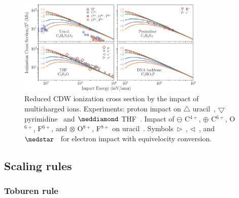 \documentclass[10pt,showpacs,twocolumn]{revtex4}
\begin{document}
\begin{figure}[t!]
\centering
\includegraphics[width=0.8\textwidth]{figuras/adn2.eps}
\caption{Reduced CDW ionization cross section by the impact of 
multicharged ions. Experiments: proton impact on 
$\triangle$ uracil~\cite{itoh2013}, 
$\bigtriangledown$ pyrimidine~\cite{wolff2014} and $\meddiamond$
THF~\cite{wang2016}. Impact of $\ominus$ C$^{4+}$, 
$\oplus$ C$^{6+}$, O$^{6+}$, F$^{6+}$, and
$\otimes$ O$^{8+}$, F$^{8+}$ on 
uracil~\cite{agnihotri2012,agnihotri2013}. 
Symbols~$\rhd$~\cite{bug2017}, $\lhd$~\cite{wolf2019}, and 
$\medstar$~\cite{fuss2009} for electron impact with equivelocity 
conversion.}
\label{fig:crossDNA_2}
\end{figure} 

\subsection{Scaling rules}
\label{subsec:scaling}
\subsubsection{Toburen rule}
\end{document}
